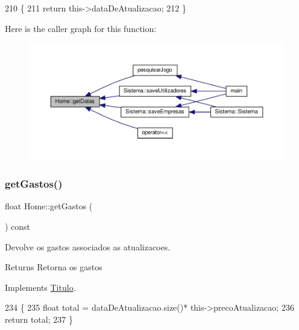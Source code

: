 \begin{DoxyCode}
210  \{
211     \textcolor{keywordflow}{return} this->dataDeAtualizacao;
212  \}
\end{DoxyCode}
Here is the caller graph for this function\+:
\nopagebreak
\begin{figure}[H]
\begin{center}
\leavevmode
\includegraphics[width=350pt]{classHome_a0ab7279a76525f48cb1b64b8bae98a44_icgraph}
\end{center}
\end{figure}
\mbox{\label{classHome_aff6d69739d404378524a591596b47856}} 
\subsubsection{\texorpdfstring{get\+Gastos()}{getGastos()}}
{\footnotesize\ttfamily float Home\+::get\+Gastos (\begin{DoxyParamCaption}{ }\end{DoxyParamCaption}) const\hspace{0.3cm}{\ttfamily [virtual]}}



Devolve os gastos associados as atualizacoes. 

\begin{DoxyReturn}{Returns}
Retorna os gastos 
\end{DoxyReturn}


Implements \hyperlink{classTitulo_a9272448eec05cd9c026c54824bf2e727}{Titulo}.


\begin{DoxyCode}
234  \{
235     \textcolor{keywordtype}{float} total = dataDeAtualizacao.size()* this->precoAtualizacao;
236     \textcolor{keywordflow}{return} total;
237  \}
\end{DoxyCode}
\mbox{\label{classHome_a52f37198fb17a321dbcac93d1c35b537}} 
